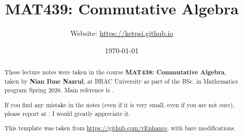 \documentclass[11pt]{scrreprt}
\begin{document}
\title{MAT439: Commutative Algebra} \subtitle{Website: \url{https://ketpsi.github.io}}
\date{\today}
\maketitle

\begin{abstract}
    These lecture notes were taken in the course \textbf{MAT438: Commutative Algebra}, taken by \textbf{Nian Ibne Nazrul}, at BRAC University as part of the BSc. in Mathematics program Spring 2026. Main reference is \cite{AtiyahMacdonald}. 

    If you find any mistake in the notes (even if it is very small, even if you are not sure), please report at ; I would greatly appreciate it. 

    This template was taken from \url{https://github.com/vEnhance}, with bare modifications. 

    \color{red}{These notes are still in a rough state, so read them at your own risk!}
\end{abstract}

\tableofcontents





































\printbibliography[title=References]
\end{document}
